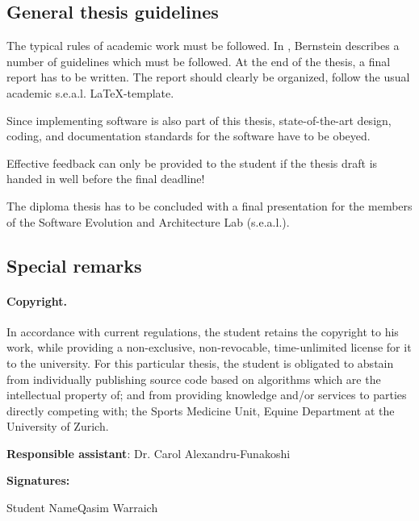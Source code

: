 \documentclass{task_description}
\begin{document}
\subsection*{General thesis guidelines}

The typical rules of academic work must be followed. In
\cite{Bernstein2005-daguide}, Bernstein describes a number of guidelines which
must be followed. At the end of the thesis, a final report has to be
written. The report should clearly be organized, follow the usual academic
s.e.a.l. \LaTeX-template.

Since implementing software is also part of this thesis, state-of-the-art
design, coding, and documentation standards for the software have to be obeyed.

Effective feedback can only be provided to the student if the thesis draft is handed in well before the final deadline!

The diploma thesis has to be concluded with a final presentation for the members
of the Software Evolution and Architecture Lab (s.e.a.l.).

\subsection*{Special remarks}
\paragraph{Copyright.}
In accordance with current regulations, the student retains the copyright to his work, while providing a non-exclusive, non-revocable, time-unlimited license for it to the university. For this particular thesis, the student is obligated to abstain from individually publishing source code based on algorithms which are the intellectual property of; and from providing knowledge and/or services to parties directly competing with; the Sports Medicine Unit, Equine Department at the University of Zurich.

\vspace{2em}
\noindent\textbf{Responsible assistant}: Dr. Carol Alexandru-Funakoshi

\vspace{2em}
\noindent\textbf{Signatures:}

\vspace{3\baselineskip}
\noindent Student Name\hfill Qasim Warraich
\vspace{2cm}


\end{document}
